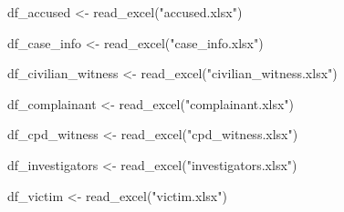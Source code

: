 \documentclass[
]{article}
\newenvironment{Shaded}{\begin{snugshade}}{\end{snugshade}}
\newcommand{\FunctionTok}[1]{\textcolor[rgb]{0.00,0.00,0.00}{#1}}
\newcommand{\NormalTok}[1]{#1}
\newcommand{\OtherTok}[1]{\textcolor[rgb]{0.56,0.35,0.01}{#1}}
\newcommand{\StringTok}[1]{\textcolor[rgb]{0.31,0.60,0.02}{#1}}
\begin{document}
\begin{Shaded}
\begin{Highlighting}[]
\NormalTok{df\_accused }\OtherTok{\textless{}{-}} \FunctionTok{read\_excel}\NormalTok{(}\StringTok{"accused.xlsx"}\NormalTok{) }
\end{Highlighting}
\end{Shaded}

\begin{Shaded}
\begin{Highlighting}[]
\NormalTok{df\_case\_info }\OtherTok{\textless{}{-}} \FunctionTok{read\_excel}\NormalTok{(}\StringTok{"case\_info.xlsx"}\NormalTok{) }
\end{Highlighting}
\end{Shaded}

\begin{Shaded}
\begin{Highlighting}[]
\NormalTok{df\_civilian\_witness }\OtherTok{\textless{}{-}} \FunctionTok{read\_excel}\NormalTok{(}\StringTok{"civilian\_witness.xlsx"}\NormalTok{) }
\end{Highlighting}
\end{Shaded}

\begin{Shaded}
\begin{Highlighting}[]
\NormalTok{df\_complainant }\OtherTok{\textless{}{-}} \FunctionTok{read\_excel}\NormalTok{(}\StringTok{"complainant.xlsx"}\NormalTok{) }
\end{Highlighting}
\end{Shaded}

\begin{Shaded}
\begin{Highlighting}[]
\NormalTok{df\_cpd\_witness }\OtherTok{\textless{}{-}} \FunctionTok{read\_excel}\NormalTok{(}\StringTok{"cpd\_witness.xlsx"}\NormalTok{) }
\end{Highlighting}
\end{Shaded}

\begin{Shaded}
\begin{Highlighting}[]
\NormalTok{df\_investigators }\OtherTok{\textless{}{-}} \FunctionTok{read\_excel}\NormalTok{(}\StringTok{"investigators.xlsx"}\NormalTok{) }
\end{Highlighting}
\end{Shaded}

\begin{Shaded}
\begin{Highlighting}[]
\NormalTok{df\_victim }\OtherTok{\textless{}{-}} \FunctionTok{read\_excel}\NormalTok{(}\StringTok{"victim.xlsx"}\NormalTok{) }
\end{Highlighting}
\end{Shaded}
\end{document}
